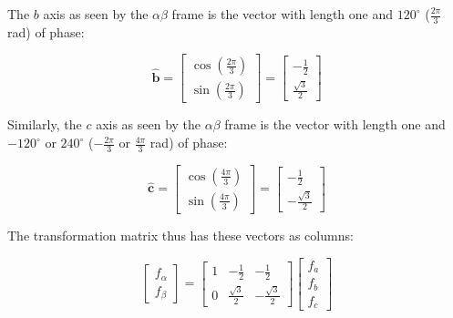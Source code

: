 \documentclass{article}
\begin{document}
The $b$ axis as seen by the $\alpha\beta$ frame is the vector with length one and $120^\circ$ ($\frac{2\pi}{3}$ rad) of phase:

\begin{equation}
    \hat{\mathbf b}
    =
    \begin{bmatrix}
        \cos\left(\frac{2\pi}{3}\right) \\
        \sin\left(\frac{2\pi}{3}\right)
    \end{bmatrix}
    =
    \begin{bmatrix}
        -\frac{1}{2} \\
        \frac{\sqrt{3}}{2}
    \end{bmatrix}
\end{equation}

Similarly, the $c$ axis as seen by the $\alpha\beta$ frame is the vector with length one and $-120^\circ$ or $240^\circ$ ($-\frac{2\pi}{3}$ or $\frac{4\pi}{3}$ rad) of phase: 

\begin{equation}
    \hat{\mathbf c}
    =
    \begin{bmatrix}
        \cos\left(\frac{4\pi}{3}\right) \\
        \sin\left(\frac{4\pi}{3}\right)
    \end{bmatrix}
    =
    \begin{bmatrix}
        -\frac{1}{2} \\
        -\frac{\sqrt{3}}{2}
    \end{bmatrix}
\end{equation}

The transformation matrix thus has these vectors as columns:

\begin{equation}
\label{clarke-transform-variant}
    \begin{bmatrix}
        f_\alpha \\
        f_\beta
    \end{bmatrix}
    =
    \begin{bmatrix}
        1 & -\frac{1}{2} & -\frac{1}{2} \\
        0 & \frac{\sqrt{3}}{2} & -\frac{\sqrt{3}}{2}
    \end{bmatrix}
    \begin{bmatrix}
        f_a \\
        f_b \\
        f_c
    \end{bmatrix}
\end{equation}
\end{document}
